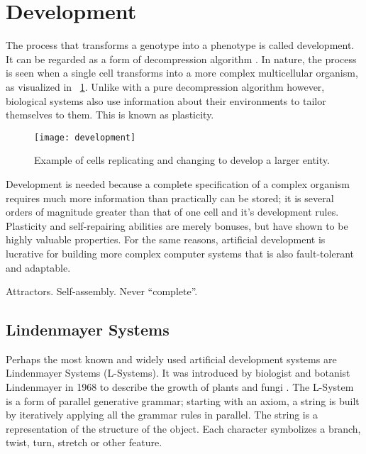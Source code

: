 
\section{Development}

The process that transforms a genotype into a phenotype is called development.
It can be regarded as a form of decompression algorithm \cite{harding2008artificial}.
In nature, the process is seen when a single cell transforms into a more complex multicellular organism, as visualized in \figurename~\ref{fig:development}.
Unlike with a pure decompression algorithm however, biological systems also use information about their environments to tailor themselves to them.
This is known as plasticity.

\begin{figure}[!ht]
    \centering
    \texttt{[image: development]}
    \caption[Development]{
        Example of cells replicating and changing to develop a larger entity.
    }
    \label{fig:development}
\end{figure}

Development is needed because a complete specification of a complex organism requires much more information than practically can be stored; it is several orders of magnitude greater than that of one cell and it's development rules.
Plasticity and self-repairing abilities are merely bonuses, but have shown to be highly valuable properties.
For the same reasons, artificial development is lucrative for building more complex computer systems that is also fault-tolerant and adaptable.

\TODO
Attractors.
Self-assembly.
Never ``complete''.

\subsection{Lindenmayer Systems}

Perhaps the most known and widely used artificial development systems are Lindenmayer Systems (L-Systems).
It was introduced by biologist and botanist Lindenmayer in 1968 to describe the growth of plants and fungi \cite{lindenmayer1968models}.
The L-System is a form of parallel generative grammar; starting with an axiom, a string is built by iteratively applying all the grammar rules in parallel.
The string is a representation of the structure of the object.
Each character symbolizes a branch, twist, turn, stretch or other feature.

